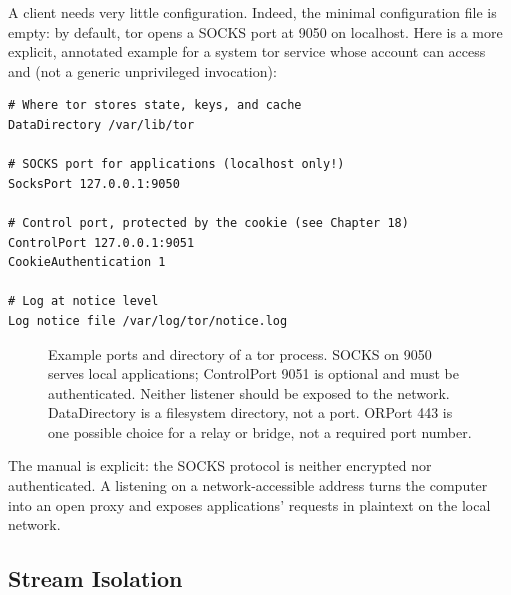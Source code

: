 A client needs very little configuration. Indeed, the minimal configuration file is empty: by default, tor opens a SOCKS port at 9050 on localhost. Here is a more explicit, annotated example for a system tor service whose account can access  and  (not a generic unprivileged invocation):
\begin{lstlisting}[language=torrc]
# Where tor stores state, keys, and cache
DataDirectory /var/lib/tor

# SOCKS port for applications (localhost only!)
SocksPort 127.0.0.1:9050

# Control port, protected by the cookie (see Chapter 18)
ControlPort 127.0.0.1:9051
CookieAuthentication 1

# Log at notice level
Log notice file /var/log/tor/notice.log
\end{lstlisting}

\begin{figure}[htbp]
\centering

\caption{Example ports and directory of a tor process. SOCKS on 9050 serves local applications; ControlPort 9051 is optional and must be authenticated. Neither listener should be exposed to the network. DataDirectory is a filesystem directory, not a port. ORPort 443 is one possible choice for a relay or bridge, not a required port number.}
\label{fig:porte}
\end{figure}

\begin{attenzione}
The manual is explicit: the SOCKS protocol is neither encrypted nor authenticated. A  listening on a network-accessible address turns the computer into an open proxy and exposes applications' requests in plaintext on the local network.
\end{attenzione}

\subsection{Stream Isolation}\label{sec:torrc-isolamento}

